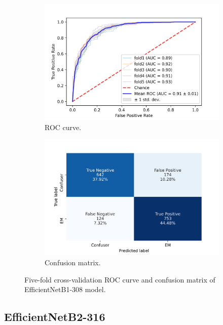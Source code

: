 \begin{figure}[h!]
	\centering
	\begin{subfigure}[b]{0.49\textwidth}
		\centering
		\includegraphics[width=\textwidth,keepaspectratio]{images/Supplement4/image175.png}
		\caption{ROC curve.}
	\end{subfigure}
	\hfill
	\begin{subfigure}[b]{0.49\textwidth}
		\centering
		\includegraphics[width=\textwidth,keepaspectratio]{images/Supplement4/image181.png}
		\caption{Confusion matrix.}
	\end{subfigure}
	\caption{Five-fold cross-validation ROC curve and confusion matrix of EfficientNetB1-308 model.}
\end{figure}

\vfill\clearpage
\subsection{EfficientNetB2-316}

